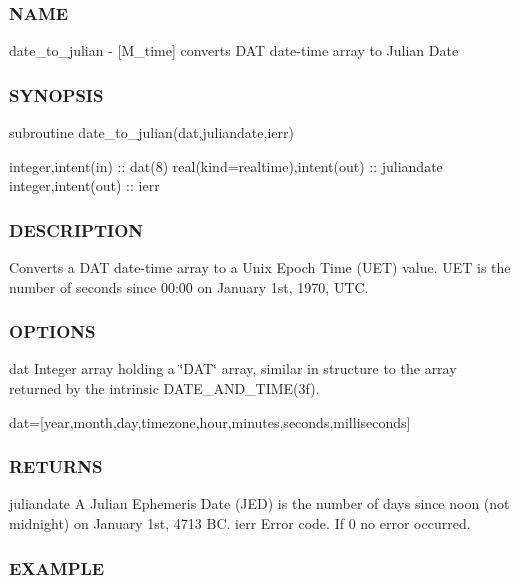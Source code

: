 \subsubsection*{N\+A\+ME}

date\+\_\+to\+\_\+julian -\/ \mbox{[}M\+\_\+time\mbox{]} converts D\+AT date-\/time array to Julian Date 

\subsubsection*{S\+Y\+N\+O\+P\+S\+IS}

\begin{DoxyVerb}subroutine date_to_julian(dat,juliandate,ierr)

 integer,intent(in)               :: dat(8)
 real(kind=realtime),intent(out)  :: juliandate
 integer,intent(out)              :: ierr
\end{DoxyVerb}


\subsubsection*{D\+E\+S\+C\+R\+I\+P\+T\+I\+ON}

Converts a D\+AT date-\/time array to a Unix Epoch Time (U\+ET) value. U\+ET is the number of seconds since 00\+:00 on January 1st, 1970, U\+TC.

\subsubsection*{O\+P\+T\+I\+O\+NS}

dat Integer array holding a \char`\"{}\+D\+A\+T\char`\"{} array, similar in structure to the array returned by the intrinsic D\+A\+T\+E\+\_\+\+A\+N\+D\+\_\+\+T\+I\+M\+E(3f).

dat=\mbox{[}year,month,day,timezone,hour,minutes,seconds,milliseconds\mbox{]} \subsubsection*{R\+E\+T\+U\+R\+NS}

juliandate A Julian Ephemeris Date (J\+ED) is the number of days since noon (not midnight) on January 1st, 4713 BC. ierr Error code. If 0 no error occurred.

\subsubsection*{E\+X\+A\+M\+P\+LE}

